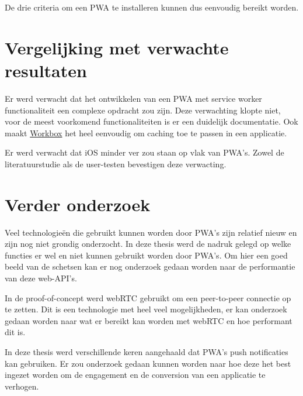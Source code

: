 		De drie criteria om een PWA te installeren kunnen dus eenvoudig bereikt worden.
		
	
	
\section{Vergelijking met verwachte resultaten}
	Er werd verwacht dat het ontwikkelen van een PWA met service worker functionaliteit een complexe opdracht zou zijn.
	Deze verwachting klopte niet, voor de meest voorkomend functionaliteiten is er een duidelijk documentatie. Ook maakt \href{https://developers.google.com/web/tools/workbox}{Workbox} het heel eenvoudig om caching toe te passen in een applicatie.
	
	Er werd verwacht dat iOS minder ver zou staan op vlak van PWA's. Zowel de literatuurstudie als de user-testen bevestigen deze verwacting.
	

\section{Verder onderzoek}
	Veel technologieën die gebruikt kunnen worden door PWA's zijn relatief nieuw en zijn nog niet grondig onderzocht.
	In deze thesis werd de nadruk gelegd op welke functies er wel en niet kunnen gebruikt worden door PWA's. Om hier een goed beeld van de schetsen kan er nog onderzoek gedaan worden naar de performantie van deze web-API's.
	
	In de proof-of-concept werd webRTC gebruikt om een peer-to-peer connectie op te zetten. Dit is een technologie met heel veel mogelijkheden, er kan onderzoek gedaan worden naar wat er bereikt kan worden met webRTC en hoe performant dit is.
	
	In deze thesis werd verschillende keren aangehaald dat PWA's push notificaties kan gebruiken. Er zou onderzoek gedaan kunnen worden naar hoe deze het best ingezet worden om de engagement en de conversion van een applicatie te verhogen.